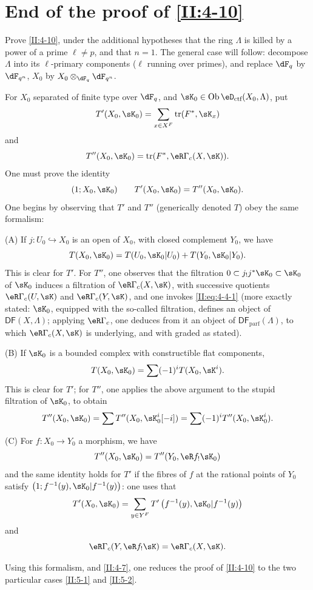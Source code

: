 \section{End of the proof of \ref{II:4-10}}\label{II:6}

Prove \ref{II:4-10}, under the additional hypotheses that the ring
$\Lambda$ is killed by a power of a prime $\ell\ne p$, and
that $n=1$. The general case will follow: decompose $\Lambda$ into its
$\ell$-primary components ($\ell$ running over primes), and
replace $\dF_q$ by $\dF_{q^n}$, $X_0$ by $X_0\otimes_{\dF_q}\dF_{q^n}$.

For $X_0$ separated of finite type over $\dF_q$, and
$\sK_0\in\ob\eD_\text{ctf}(X_0,\Lambda)$, put
\[
  T'(X_0,\sK_0) = \sum_{x\in X^F} \tr(F^*,\sK_x)
\]
and
\[
  T''(X_0,\sK_0) = \tr(F^*,\eR\Gamma_c(X,\sK)) \text{.}
\]
One must prove the identity
\[
  (1;X_0,\sK_0) \qquad T'(X_0,\sK_0) = T''(X_0,\sK_0) \text{.}
\]
One begins by observing that $T'$ and $T''$ (generically denoted $T$)
obey the same formalism:

(A) If $j:U_0\hookrightarrow X_0$ is an open of $X_0$, with closed
complement $Y_0$, we have
\[
  T(X_0,\sK_0) = T(U_0,\sK_0|U_0) + T(Y_0,\sK_0|Y_0) \text{.}
\]
This is clear for $T'$. For $T''$, one observes that the filtration
$0\subset j_! j^* \sK_0\subset \sK_0$ of $\sK_0$ induces a filtration of
$\eR\Gamma_c(X,\sK)$, with successive quotients $\eR\Gamma_c(U,\sK)$ and
$\eR\Gamma_c(Y,\sK)$, and one invokes \eqref{II:eq:4-4-1} (more exactly
stated: $\sK_0$, equipped with the so-called filtration, defines an object of
$\mathsf{DF}(X,\Lambda)$; applying $\eR\Gamma_c$, one deduces from it an
object of $\mathsf{DF}_\text{parf}(\Lambda)$, to which $\eR\Gamma_c(X,\sK)$ is
underlying, and with graded as stated).

(B) If $\sK_0$ is a bounded complex with constructible flat components,
\[
  T(X_0,\sK_0) = \sum (-1)^i T(X_0,\sK^i) \text{.}
\]
This is clear for $T'$; for $T''$, one applies the above argument to the
stupid filtration of $\sK_0$, to obtain
\[
  T''(X_0,\sK_0) = \sum T''(X_0,\sK_0^i[-i]) = \sum (-1)^i T''(X_0,\sK_0^i) \text{.}
\]

(C) For $f:X_0\to Y_0$ a morphism, we have
\[
  T''(X_0,\sK_0) = T''(Y_0,\eR f_! \sK_0)
\]
and the same identity holds for $T'$ if the fibres of $f$ at the
rational points of $Y_0$ satisfy $\left(1;f^{-1}(y),\sK_0|f^{-1}(y)\right)$: one
uses that
\[
  T'(X_0,\sK_0) = \sum_{y\in Y^F} T'\left(f^{-1}(y), \sK_0|f^{-1}(y)\right)
\]
and
\[
  \eR\Gamma_c(Y, \eR f_! \sK) = \eR\Gamma_c(X,\sK) \text{.}
\]

Using this formalism, and \ref{II:4-7}, one reduces the proof of \ref{II:4-10}
to the two particular cases \ref{II:5-1} and \ref{II:5-2}.
